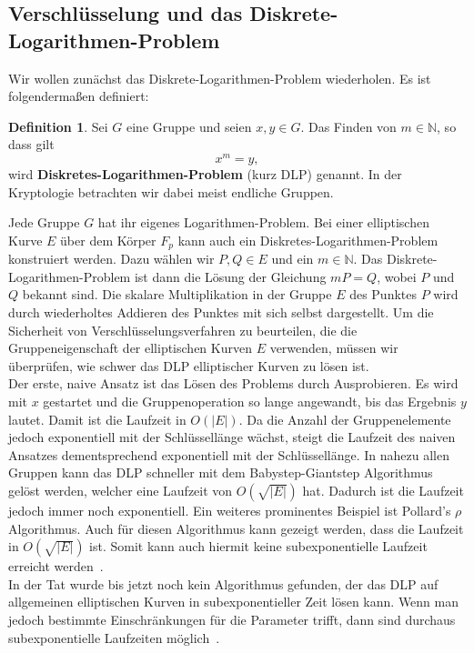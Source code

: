 \documentclass[hidelinks]{article}
\theoremstyle{plain}
\theoremstyle{definition}
\newtheorem{defn}[thm]{Definition}
\theoremstyle{rem}
\begin{document}
\begin{sloppypar}
\subsection{Verschlüsselung und das Diskrete-Logarithmen-Problem}
Wir wollen zunächst das Diskrete-Logarithmen-Problem wiederholen. Es ist folgendermaßen definiert:
\begin{defn} \label{DLP}
    Sei $G$ eine Gruppe und seien $x,y \in G$. Das Finden von $m \in \mathbb{N}$, so dass gilt
    \begin{equation*}
        x^m = y,
    \end{equation*}
    wird \textbf{Diskretes-Logarithmen-Problem} (kurz DLP) genannt. In der Kryptologie betrachten wir dabei meist endliche Gruppen.
\end{defn}
Jede Gruppe $G$ hat ihr eigenes Logarithmen-Problem.
Bei einer elliptischen Kurve $E$ über dem Körper $F_p$ kann auch ein Diskretes-Logarithmen-Problem konstruiert werden. Dazu wählen wir $P,Q \in E$ und ein $m \in \mathbb{N}$. Das Diskrete-Logarithmen-Problem ist dann die Lösung der Gleichung $mP = Q$, wobei $P$ und $Q$ bekannt sind. 
Die skalare Multiplikation in der Gruppe $E$ des Punktes $P$ wird durch wiederholtes Addieren des Punktes mit sich selbst dargestellt. 
Um die Sicherheit von Verschlüsselungsverfahren zu beurteilen, die die Gruppeneigenschaft der elliptischen Kurven $E$ verwenden, müssen wir überprüfen, wie schwer das DLP elliptischer Kurven zu lösen ist.\\
\newline
Der erste, naive Ansatz ist das Lösen des Problems durch Ausprobieren. Es wird mit $x$ gestartet und die Gruppenoperation so lange angewandt, bis das Ergebnis $y$ lautet. 
Damit ist die Laufzeit in $O(|E|)$. 
Da die Anzahl der Gruppenelemente jedoch exponentiell mit der Schlüssellänge wächst, steigt die Laufzeit des naiven Ansatzes dementsprechend exponentiell mit der Schlüssellänge.
In nahezu allen Gruppen kann das DLP schneller mit dem Babystep-Giantstep Algorithmus gelöst werden, welcher eine Laufzeit von $O(\sqrt{|E|})$ hat.
Dadurch ist die Laufzeit jedoch immer noch exponentiell. 
Ein weiteres prominentes Beispiel ist Pollard's $\rho$ Algorithmus. Auch für diesen Algorithmus kann gezeigt werden, dass die Laufzeit in $O(\sqrt{|E|})$ ist. Somit kann auch hiermit keine subexponentielle Laufzeit erreicht werden~\cite[Seite~386]{silverman}. \\
In der Tat wurde bis jetzt noch kein Algorithmus gefunden, der das DLP auf allgemeinen elliptischen Kurven in subexponentieller Zeit lösen kann. Wenn man jedoch bestimmte Einschränkungen für die Parameter trifft, dann sind durchaus subexponentielle Laufzeiten möglich~\cite{joux2011}.

\end{sloppypar}
\end{document}
